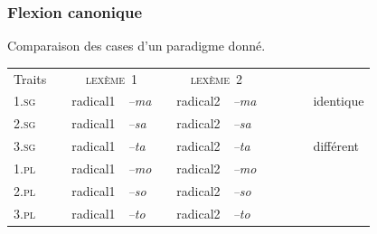 \begin{frame}
\frametitle{Flexion canonique}
Comparaison des cases d'un paradigme donné.

\scriptsize

\begin{table}
\begin{tabular}{|l| p{1mm}|ll|p{1mm}|ll|p{1mm}cl}
\cline{1-1}\cline{3-4}\cline{6-7}
Traits&&\multicolumn{2}{|c|}{\cellcolor{white}\textsc{ lexème~1}}&&\multicolumn{2}{|c|}{\textsc{ lexème~2}}&&\\
\cline{1-1}\cline{3-4}\cline{6-7}
\textsc{1.sg}&& \cellcolor{ciel}radical1& {\em --ma}&&radical2& {\em
  --ma}&&\cellcolor{ciel}~~~&identique\\
\cline{1-1}\cline{3-4}\cline{6-7}
\textsc{2.sg}& &\cellcolor{ciel}radical1&{\em --sa}&&radical2& {\em --sa}&&&\\
\cline{1-1}\cline{3-4}\cline{6-7}

\textsc{3.sg}&& \cellcolor{ciel}radical1&{\em --ta}&&radical2& {\em
  --ta}&&\cellcolor{mandarine}&différent\\
\cline{1-1}\cline{3-4}\cline{6-7}
\textsc{1.pl}&&\cellcolor{ciel}radical1& {\em --mo}&&radical2& {\em --mo}&&\\
\cline{1-1}\cline{3-4}\cline{6-7}
\textsc{2.pl}&&\cellcolor{ciel}radical1& {\em --so}&&radical2& {\em --so}&&\\
\cline{1-1}\cline{3-4}\cline{6-7}
\textsc{3.pl}&&\cellcolor{ciel}radical1& {\em --to}&&radical2& {\em --to}&&\\
\cline{1-1}\cline{3-4}\cline{6-7}
\end{tabular}\\[1mm]
\end{table}
\end{frame}

